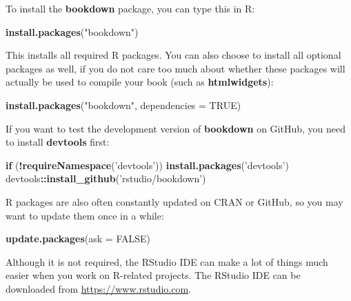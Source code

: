 \documentclass[12pt,]{krantz}
\makeatletter
\newenvironment{Shaded}{\begin{snugshade}}{\end{snugshade}}
\newcommand{\KeywordTok}[1]{\textcolor[rgb]{0.13,0.29,0.53}{\textbf{#1}}}
\newcommand{\DataTypeTok}[1]{\textcolor[rgb]{0.13,0.29,0.53}{#1}}
\newcommand{\StringTok}[1]{\textcolor[rgb]{0.31,0.60,0.02}{#1}}
\newcommand{\OtherTok}[1]{\textcolor[rgb]{0.56,0.35,0.01}{#1}}
\newcommand{\ControlFlowTok}[1]{\textcolor[rgb]{0.13,0.29,0.53}{\textbf{#1}}}
\newcommand{\OperatorTok}[1]{\textcolor[rgb]{0.81,0.36,0.00}{\textbf{#1}}}
\newcommand{\NormalTok}[1]{#1}
\newenvironment{kframe}{%
\medskip{}
\setlength{\fboxsep}{.8em}
 \def\at@end@of@kframe{}%
 \ifinner\ifhmode%
  \def\at@end@of@kframe{\end{minipage}}%
  \begin{minipage}{\columnwidth}%
 \fi\fi%
 \def\FrameCommand##1{\hskip\@totalleftmargin \hskip-\fboxsep
 \colorbox{shadecolor}{##1}\hskip-\fboxsep
     \hskip-\linewidth \hskip-\@totalleftmargin \hskip\columnwidth}%
 \MakeFramed {\advance\hsize-\width
   \@totalleftmargin\z@ \linewidth\hsize
   \@setminipage}}%
 {\par\unskip\endMakeFramed%
 \at@end@of@kframe}
\renewenvironment{Shaded}{\begin{kframe}}{\end{kframe}}
\theoremstyle{definition}
\theoremstyle{definition}
\theoremstyle{definition}
\theoremstyle{remark}
\makeatother
\begin{document}
To install the \textbf{bookdown} package, you can type this in R:

\begin{Shaded}
\begin{Highlighting}[]
\KeywordTok{install.packages}\NormalTok{(}\StringTok{"bookdown"}\NormalTok{)}
\end{Highlighting}
\end{Shaded}

This installs all required R packages. You can also choose to install
all optional packages as well, if you do not care too much about whether
these packages will actually be used to compile your book (such as
\textbf{htmlwidgets}):

\begin{Shaded}
\begin{Highlighting}[]
\KeywordTok{install.packages}\NormalTok{(}\StringTok{"bookdown"}\NormalTok{, }\DataTypeTok{dependencies =} \OtherTok{TRUE}\NormalTok{)}
\end{Highlighting}
\end{Shaded}

If you want to test the development version of \textbf{bookdown} on
GitHub, you need to install \textbf{devtools} first:

\begin{Shaded}
\begin{Highlighting}[]
\ControlFlowTok{if}\NormalTok{ (}\OperatorTok{!}\KeywordTok{requireNamespace}\NormalTok{(}\StringTok{'devtools'}\NormalTok{)) }\KeywordTok{install.packages}\NormalTok{(}\StringTok{'devtools'}\NormalTok{)}
\NormalTok{devtools}\OperatorTok{::}\KeywordTok{install_github}\NormalTok{(}\StringTok{'rstudio/bookdown'}\NormalTok{)}
\end{Highlighting}
\end{Shaded}

R packages are also often constantly updated on CRAN or GitHub, so you
may want to update them once in a while:

\begin{Shaded}
\begin{Highlighting}[]
\KeywordTok{update.packages}\NormalTok{(}\DataTypeTok{ask =} \OtherTok{FALSE}\NormalTok{)}
\end{Highlighting}
\end{Shaded}

Although it is not required, the RStudio IDE can make a lot of things
much easier when you work on R-related projects. The RStudio IDE can be
downloaded from \url{https://www.rstudio.com}.
\end{document}
